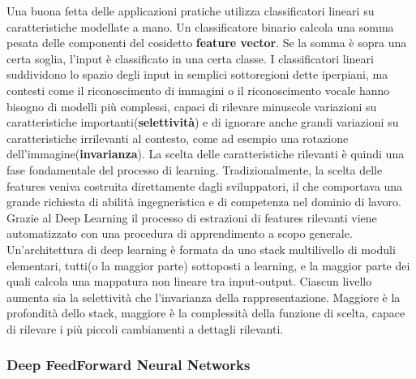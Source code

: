 Una buona fetta delle applicazioni pratiche utilizza classificatori lineari su caratteristiche modellate a mano. 
Un classificatore binario calcola una somma pesata delle componenti del cosidetto \textbf{feature vector}. Se la somma è sopra una certa soglia, 
l'input è classificato in una certa classe. I classificatori lineari suddividono lo spazio degli input in semplici sottoregioni dette iperpiani, ma contesti come il riconoscimento di immagini o il riconoscimento vocale hanno
bisogno di modelli più complessi, capaci di rilevare  minuscole variazioni su caratteristiche importanti(\textbf{selettività}) e di ignorare anche grandi variazioni su caratteristiche irrilevanti al contesto, come ad esempio una rotazione dell'immagine(\textbf{invarianza}). La scelta delle caratteristiche rilevanti è quindi una
fase fondamentale del processo di learning. Tradizionalmente, la scelta delle features veniva costruita direttamente dagli sviluppatori, il che comportava una grande richiesta di abilità ingegneristica e di competenza nel dominio di lavoro.
Grazie al Deep  Learning  il processo di estrazioni di features rilevanti viene automatizzato con una procedura di apprendimento a scopo generale.
Un'architettura di deep learning è formata da uno stack multilivello di moduli elementari, tutti(o la maggior parte) sottoposti a learning, e la maggior parte dei quali
calcola una mappatura non lineare tra input-output. Ciascun livello aumenta sia la selettività che l'invarianza della rappresentazione. 
Maggiore è la profondità dello stack, maggiore è la complessità della funzione di scelta, capace di rilevare i più piccoli cambiamenti a dettagli rilevanti\cite{deep}.

\subsubsection{Deep FeedForward Neural Networks}

